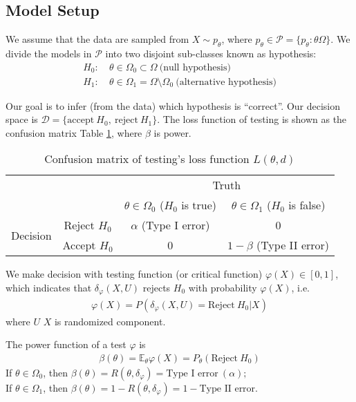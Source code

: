 
\subsection{Model Setup}

We assume that the data are sampled from $X\sim{p_\theta}$,
where $p_\theta\in\mathcal{P}=\{p_\theta:\theta\Omega\}$.
We divide the models in $\mathcal{P}$ into two disjoint sub-classes known as hypothesis:
\begin{align}
    H_0:&~\theta\in\Omega_0\subset{\Omega}~\text{(null hypothesis)}\\
    H_1:&~\theta\in\Omega_1=\Omega\setminus\Omega_0~\text{(alternative hypothesis)}
\end{align}

Our goal is to infer (from the data) which hypothesis is ``correct''.
Our decision space is $\mathcal{D}=\{\text{accept}~H_0,~\text{reject}~H_1\}$.
The loss function of testing is shown as the confusion matrix Table \ref{tab:testconfmtx},
where $\beta$ is power.

\begin{table}[htbp]
  \centering
  \caption{Confusion matrix of testing's loss function $L(\theta,d)$}
    \begin{tabular}{cc|cc}
          &       & \multicolumn{2}{c}{Truth} \\
          &       & $\theta\in\Omega_0$ ($H_0$ is true) & $\theta\in\Omega_1$ ($H_0$ is false) \\
    \midrule
    \multirow{2}[1]{*}{Decision}
          & Reject $H_0$ & $\alpha$ (Type I error) & 0 \\
          & Accept $H_0$ & 0     & $1-\beta$ (Type II error) \\
    \end{tabular}
  \label{tab:testconfmtx}%
\end{table}%

We make decision with testing function (or critical function) $\varphi(X)\in[0,1]$,
which indicates that $\delta_\varphi(X,U)$ rejects $H_0$ with probability $\varphi(X)$, i.e.
\begin{gather}
    \varphi(X)=P(\delta_\varphi(X,U)=\text{Reject}~H_0|X)
\end{gather}
where $U$  $X$ is randomized component.

\begin{definition}
    The power function of a test $\varphi$ is 
    \begin{gather}
        \beta(\theta)=\mathbb{E}_\theta\varphi(X)=P_\theta(\text{Reject}~H_0)
    \end{gather}
    If $\theta\in\Omega_0$, then $\beta(\theta)=R(\theta,\delta_\varphi)=\text{Type I error}~(\alpha);$\\
    If $\theta\in\Omega_1$, then $\beta(\theta)=1-R(\theta,\delta_\varphi)=1-\text{Type II error}$.
\end{definition}


